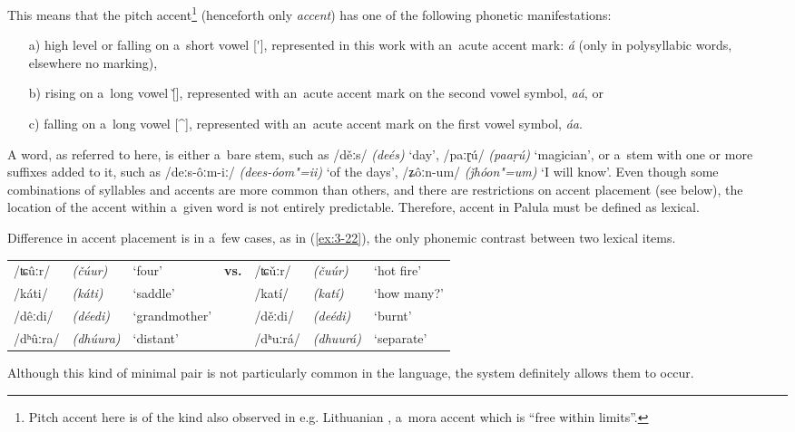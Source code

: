 This means that the pitch accent\footnote{Pitch accent here is of the kind also observed in e.g. Lithuanian \citep[73--82]{szemerenyi1996}, a~mora accent which is ``free within limits''.} (henceforth only \textit{accent}) has one of the following phonetic manifestations:
\begin{enumerate}
\item[a)] high level or falling on a~short vowel [\'{}], represented in this work with an~acute accent mark: \textit{á} (only in polysyllabic words, elsewhere no marking), 
\item[b)] rising on a~long vowel [\v{}], represented with an~acute accent mark on the second vowel symbol, \textit{aá}, or 
\item[c)] falling on a~long vowel [\^{}], represented with an~acute accent mark on the first vowel symbol, \textit{áa}.
\end{enumerate}
A word, as referred to here, is either a~bare stem, such as /děːs/ \textit{(deés)} `day', /paːɽú/ \textit{(paaṛú)} `magician', or a~stem with one or more suffixes added to it, such as /deːs-ôːm-iː/ \textit{(dees-óom"=ii)} `of the days', /ʑôːn-um/ \textit{(ǰhóon"=um)} `I will know'. Even though some combinations of syllables and accents are more common than others, and there are restrictions on accent placement (see below), the location of the accent within a~given word is not entirely predictable. Therefore, accent in Palula must be defined as lexical. 


Difference in accent placement is in a~few cases, as in (\ref{ex:3-22}), the only phonemic contrast between two lexical items.


\begin{exe}
\extab
\label{ex:3-22}
\begin{tabularx}{116mm}{ l l Q l l l Q }
/ʨûːr/ &
\textit{(čúur)} &
`four' &
\textbf{vs.} &
/ʨǔːr/ &
\textit{(čuúr)} &
`hot fire'\\
/káti/ &
\textit{(káti)} &
`saddle' &
&
/katí/ &
\textit{(katí)} &
`how many?'\\
/dêːdi/ &
\textit{(déedi)} &
`grand\-mother' &
&
/děːdi/ &
\textit{(deédi)} &
`burnt'\\
/dʰûːra/ &
\textit{(dhúura)} &
`distant' &
&
/dʰuːrá/ &
\textit{(dhuurá)} &
`separate'\\
\end{tabularx}
\end{exe}

Although this kind of minimal pair is not particularly common in the language, the system definitely allows them to occur.

